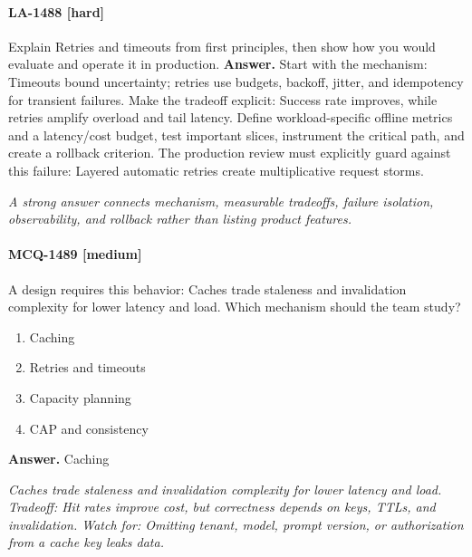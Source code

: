 \paragraph{LA-1488 [hard]} Explain Retries and timeouts from first principles, then show how you would evaluate and operate it in production.
\noindent\textbf{Answer.} Start with the mechanism: Timeouts bound uncertainty; retries use budgets, backoff, jitter, and idempotency for transient failures. Make the tradeoff explicit: Success rate improves, while retries amplify overload and tail latency. Define workload-specific offline metrics and a latency/cost budget, test important slices, instrument the critical path, and create a rollback criterion. The production review must explicitly guard against this failure: Layered automatic retries create multiplicative request storms.
\par\textit{A strong answer connects mechanism, measurable tradeoffs, failure isolation, observability, and rollback rather than listing product features.}
\paragraph{MCQ-1489 [medium]} A design requires this behavior: Caches trade staleness and invalidation complexity for lower latency and load. Which mechanism should the team study?
\begin{enumerate}[label=\Alph*.]
\item Caching
\item Retries and timeouts
\item Capacity planning
\item CAP and consistency
\end{enumerate}
\noindent\textbf{Answer.} Caching
\par\textit{Caches trade staleness and invalidation complexity for lower latency and load. Tradeoff: Hit rates improve cost, but correctness depends on keys, TTLs, and invalidation. Watch for: Omitting tenant, model, prompt version, or authorization from a cache key leaks data.}
